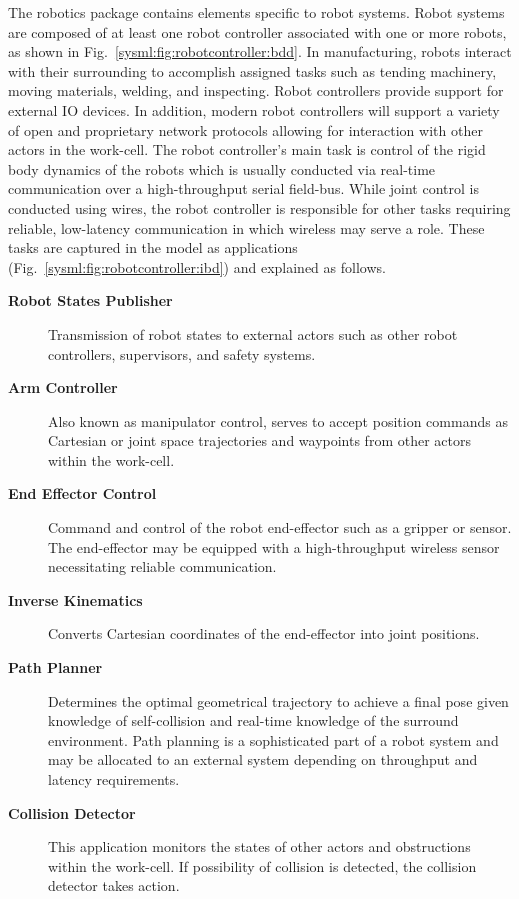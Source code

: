 The robotics package contains elements specific to robot systems.  Robot systems are composed of at least one robot controller associated with one or more robots, as shown in Fig.~\ref{sysml:fig:robotcontroller:bdd}.  In manufacturing, robots interact with their surrounding to accomplish assigned tasks such as tending machinery, moving materials, welding, and inspecting. Robot controllers provide support for external IO devices.  In addition, modern robot controllers will support a variety of open and proprietary network protocols allowing for interaction with other actors in the work-cell.  The robot controller's main task is control of the rigid body dynamics of the robots which is usually conducted via real-time communication over a high-throughput serial field-bus. While joint control is conducted using wires, the robot controller is responsible for other tasks requiring reliable, low-latency communication in which wireless may serve a role.  These tasks are captured in the model as applications (Fig.~\ref{sysml:fig:robotcontroller:ibd}) and explained as follows.

\begin{description}
	
	\item[\textbf{Robot States Publisher}] Transmission of robot states to external actors such as other robot controllers, supervisors, and safety systems.
	
	\item[\textbf{Arm Controller}] Also known as manipulator control, serves to accept position commands as Cartesian or joint space trajectories and waypoints from other actors within the work-cell.
	
	\item[\textbf{End Effector Control}] Command and control of the robot end-effector such as a gripper or sensor.  The end-effector may be equipped with a high-throughput wireless sensor necessitating reliable communication.
	
	\item[\textbf{Inverse Kinematics}] Converts Cartesian coordinates of the end-effector into joint positions.
	
	\item[\textbf{Path Planner}] Determines the optimal geometrical trajectory to achieve a final pose given knowledge of self-collision and real-time knowledge of the surround environment.  Path planning is a sophisticated part of a robot system and may be allocated to an external system depending on throughput and latency requirements.
	
	\item[\textbf{Collision Detector}] This application monitors the states of other actors and obstructions within the work-cell. If possibility of collision is detected, the collision detector takes action.
	
\end{description} 


